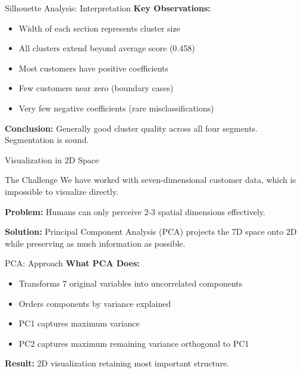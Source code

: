 \documentclass[aspectratio=169,ignorenonframetext]{beamer}
\begin{document}
\begin{frame}{Silhouette Analysis: Interpretation}
\textbf{Key Observations:}

\begin{itemize}
\item
  Width of each section represents cluster size
\item
  All clusters extend beyond average score (0.458)
\item
  Most customers have positive coefficients
\item
  Few customers near zero (boundary cases)
\item
  Very few negative coefficients (rare misclassifications)
\end{itemize}

\textbf{Conclusion:} Generally good cluster quality across all four
segments. Segmentation is sound.
\end{frame}

\begin{frame}{Visualization in 2D Space}
\begin{block}{The Challenge}
We have worked with seven-dimensional customer data, which is impossible
to visualize directly.

\textbf{Problem:} Humans can only perceive 2-3 spatial dimensions
effectively.

\textbf{Solution:} Principal Component Analysis (PCA) projects the 7D
space onto 2D while preserving as much information as possible.
\end{block}
\end{frame}

\begin{frame}{PCA: Approach}
\textbf{What PCA Does:}

\begin{itemize}
\item
  Transforms 7 original variables into uncorrelated components
\item
  Orders components by variance explained
\item
  PC1 captures maximum variance
\item
  PC2 captures maximum remaining variance orthogonal to PC1
\end{itemize}

\textbf{Result:} 2D visualization retaining most important structure.
\end{frame}
\end{document}
